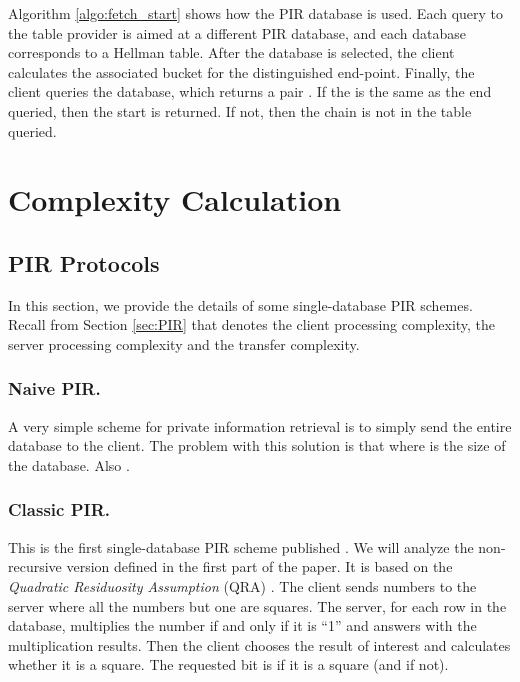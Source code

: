 \documentclass{llncs}
\begin{document}
Algorithm \ref{algo:fetch_start} shows how the PIR database is used. Each query
to the table provider is aimed at a different PIR database,
and each database corresponds to a Hellman table. 
After the database is selected, the client calculates the associated
bucket for the distinguished end-point. Finally, the client queries the database, which
returns a pair . If the  is
the same as the end queried, then the start is returned. If not, then the chain
is not in the table queried.



\section{Complexity Calculation} \label{sec:complexity}

\subsection{PIR Protocols} \label{sec:PIR-details}

In this section, we provide the details of some single-database PIR schemes.
Recall from Section \ref{sec:PIR} that 
 denotes the client processing complexity,
 the server processing complexity and 
 the transfer complexity.


\subsubsection{Naive PIR.}

A very simple scheme for private information retrieval is to simply
send the entire database to the client. The problem with this solution
is that  where  is the size of the database. Also
.


\subsubsection{Classic PIR.}

This is the first single-database PIR
scheme published \cite{paper:pir_classic}. We will analyze the non-recursive
version defined in the first part of the paper. It is based on the
\emph{Quadratic Residuosity Assumption} (QRA) \cite{paper:bbs-86,paper:bc-86,paper:bdmp-91,paper:gm-84}.
The client sends  numbers to the server where all the
numbers but one are squares. The server, for each row in the database,
multiplies the number if and only if it is ``1'' and
answers with the  multiplication results. Then the client
chooses the result of interest and calculates whether it is a square.
The requested bit is  if it is a square (and  if not).
\end{document}
